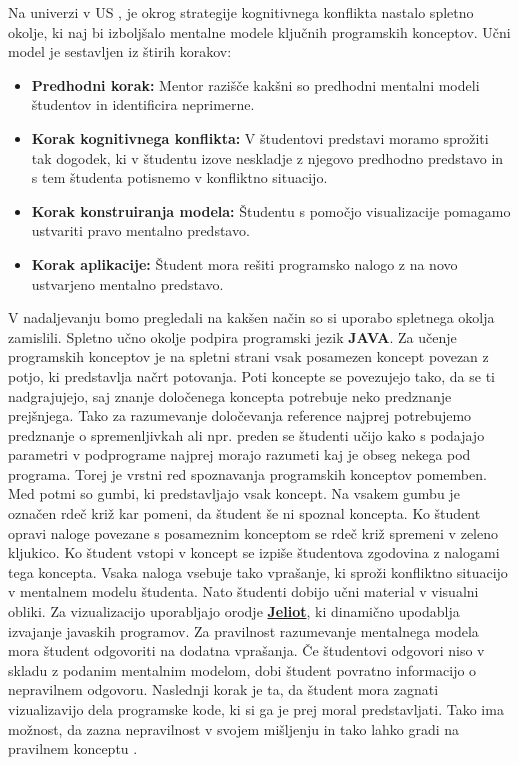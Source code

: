 
Na univerzi v US \cite{mentalModels}, je okrog strategije kognitivnega konflikta
nastalo spletno okolje, ki naj bi izboljšalo mentalne
modele ključnih programskih konceptov. Učni model je sestavljen iz
štirih korakov:

\begin{itemize}
\item \textbf{Predhodni korak:} Mentor razišče kakšni so predhodni
 mentalni modeli študentov in identificira neprimerne.
\item \textbf{Korak kognitivnega konflikta:} V študentovi predstavi
  moramo sprožiti tak dogodek, ki v študentu izove neskladje z njegovo
  predhodno predstavo in s tem študenta potisnemo v konfliktno
  situacijo.
\item \textbf{Korak konstruiranja modela:} Študentu s pomočjo
  visualizacije pomagamo ustvariti pravo mentalno predstavo.
\item \textbf{Korak aplikacije: } Študent mora rešiti programsko
  nalogo z na novo ustvarjeno mentalno predstavo.
\end{itemize}

V nadaljevanju bomo pregledali na kakšen način so si uporabo spletnega
okolja zamislili.  Spletno učno okolje podpira programski jezik
\textbf{JAVA}. Za učenje programskih konceptov je na spletni strani
vsak posamezen koncept povezan z potjo, ki predstavlja načrt
potovanja. Poti koncepte se povezujejo tako, da se ti nadgrajujejo,
saj znanje določenega koncepta potrebuje neko predznanje
prejšnjega. Tako za razumevanje določevanja reference najprej
potrebujemo predznanje o spremenljivkah ali npr. preden se študenti
učijo kako s podajajo parametri v podprograme najprej morajo razumeti
kaj je obseg nekega pod programa. Torej je vrstni red spoznavanja
programskih konceptov pomemben. Med potmi so gumbi, ki predstavljajo
vsak koncept. Na vsakem gumbu je označen rdeč križ kar pomeni, da
študent še ni spoznal koncepta. Ko študent opravi naloge povezane s
posameznim konceptom se rdeč križ spremeni v zeleno kljukico. Ko
študent vstopi v koncept se izpiše študentova zgodovina z nalogami
tega koncepta. Vsaka naloga vsebuje tako vprašanje, ki sproži
konfliktno situacijo v mentalnem modelu študenta. Nato študenti dobijo
učni material v visualni obliki. Za vizualizacijo uporabljajo orodje
\href{https://cs.joensuu.fi/jeliot/}{\textbf{Jeliot}}, ki dinamično
upodablja izvajanje javaskih programov. Za pravilnost razumevanje
mentalnega modela mora študent odgovoriti na dodatna vprašanja. Če
študentovi odgovori niso v skladu z podanim mentalnim modelom, dobi
študent povratno informacijo o nepravilnem odgovoru. Naslednji korak
je ta, da študent mora zagnati vizualizavijo dela programske kode, ki
si ga je prej moral predstavljati. Tako ima možnost, da zazna
nepravilnost v svojem mišljenju in tako lahko gradi na pravilnem
konceptu \cite{mentalModels}.

